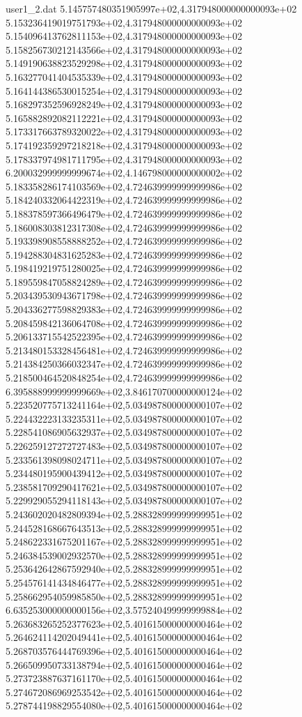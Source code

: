 \begin{filecontents}{user1_2.dat}
5.145757480351905997e+02,4.317948000000000093e+02
5.153236419019751793e+02,4.317948000000000093e+02
5.154096413762811153e+02,4.317948000000000093e+02
5.158256730212143566e+02,4.317948000000000093e+02
5.149190638823529298e+02,4.317948000000000093e+02
5.163277041404535339e+02,4.317948000000000093e+02
5.164144386530015254e+02,4.317948000000000093e+02
5.168297352596928249e+02,4.317948000000000093e+02
5.165882892082112221e+02,4.317948000000000093e+02
5.173317663789320022e+02,4.317948000000000093e+02
5.174192359297218218e+02,4.317948000000000093e+02
5.178337974981711795e+02,4.317948000000000093e+02
6.200032999999999674e+02,4.146798000000000002e+02
5.183358286174103569e+02,4.724639999999999986e+02
5.184240332064422319e+02,4.724639999999999986e+02
5.188378597366496479e+02,4.724639999999999986e+02
5.186008303812317308e+02,4.724639999999999986e+02
5.193398908558888252e+02,4.724639999999999986e+02
5.194288304831625283e+02,4.724639999999999986e+02
5.198419219751280025e+02,4.724639999999999986e+02
5.189559847058824289e+02,4.724639999999999986e+02
5.203439530943671798e+02,4.724639999999999986e+02
5.204336277598829383e+02,4.724639999999999986e+02
5.208459842136064708e+02,4.724639999999999986e+02
5.206133715542522395e+02,4.724639999999999986e+02
5.213480153328456481e+02,4.724639999999999986e+02
5.214384250366032347e+02,4.724639999999999986e+02
5.218500464520848254e+02,4.724639999999999986e+02
6.395888999999999669e+02,3.846170700000000124e+02
5.223520775713241164e+02,5.034987800000000107e+02
5.224432223133235311e+02,5.034987800000000107e+02
5.228541086905632937e+02,5.034987800000000107e+02
5.226259127272727483e+02,5.034987800000000107e+02
5.233561398098024711e+02,5.034987800000000107e+02
5.234480195900439412e+02,5.034987800000000107e+02
5.238581709290417621e+02,5.034987800000000107e+02
5.229929055294118143e+02,5.034987800000000107e+02
5.243602020482809394e+02,5.288328999999999951e+02
5.244528168667643513e+02,5.288328999999999951e+02
5.248622331675201167e+02,5.288328999999999951e+02
5.246384539002932570e+02,5.288328999999999951e+02
5.253642642867592940e+02,5.288328999999999951e+02
5.254576141434846477e+02,5.288328999999999951e+02
5.258662954059985850e+02,5.288328999999999951e+02
6.635253000000000156e+02,3.575240499999999884e+02
5.263683265252377623e+02,5.401615000000000464e+02
5.264624114202049441e+02,5.401615000000000464e+02
5.268703576444769396e+02,5.401615000000000464e+02
5.266509950733138794e+02,5.401615000000000464e+02
5.273723887637161170e+02,5.401615000000000464e+02
5.274672086969253542e+02,5.401615000000000464e+02
5.278744198829554080e+02,5.401615000000000464e+02

\end{filecontents}
